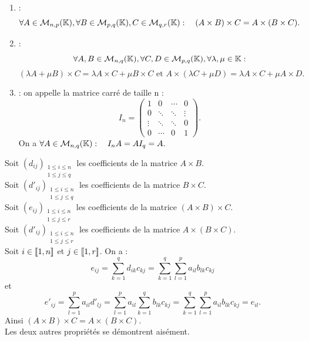 \documentclass{book}
\begin{document}
\begin{Proposition}[Propriétés]
\begin{enumerate}
\item
   : $$\forall A \in   \mathcal{M}_{n,p}(\mathbb{K}),\forall  B \in   \mathcal{M}_{p,q}(\mathbb{K}),C \in   \mathcal{M}_{q,r}(\mathbb{K}):\quad  (A \times B) \times C = A \times (B \times C).$$
\item
   : 
  $$\forall A,B \in   \mathcal{M}_{n,q}(\mathbb{K}),\forall C,D \in   \mathcal{M}_{p,q}(\mathbb{K}),\forall \lambda,\mu \in \mathbb{K}:$$
  $$  (\lambda A + \mu B) \times C = \lambda A\times C + \mu B\times C\text{ et }A\times (\lambda C+ \mu D) =\lambda A\times C + \mu A\times D.$$
\item
   : on appelle  la matrice carré de taille n : $$I_n=\begin{pmatrix}1&0&\cdots &0\\0&\ddots &\ddots &\vdots \\\vdots &\ddots &\ddots &0\\0&\cdots &0&1\end{pmatrix}.$$
 On a $\forall A \in   \mathcal{M}_{n,q}(\mathbb{K}) :\quad I_n A =A I_q = A.$ 
\end{enumerate}
\end{Proposition}
\begin{Demonstration}
Soit $(d_{ij})_{\substack{1\leq i\leq n\\1\leq j\leq q}}$ les coefficients de la matrice $A\times B$.\\
Soit $(d'_{ij})_{\substack{1\leq i\leq n\\1\leq j\leq q}}$ les coefficients de la matrice $B\times C$.\\
Soit $(e_{ij})_{\substack{1\leq i\leq n\\1\leq j\leq r}}$ les coefficients de la matrice $(A\times B)\times C$.\\
Soit $(d'_{ij})_{\substack{1\leq i\leq n\\1\leq j\leq r}}$ les coefficients de la matrice $A\times (B\times C)$.\\
Soit $i\in \mathopen\lbrack\!\lbrack1,n \mathclose\rbrack\!\rbrack$ et $j\in \mathopen\lbrack\!\lbrack1,r \mathclose\rbrack\!\rbrack$. 
On a :
$$e_{ij}=\sum_{k=1}^q d_{ik}c_{kj}=\sum_{k=1}^q \sum_{l=1}^p a_{il}b_{lk} c_{kj}$$
et  
$$e'_{ij}=\sum_{l=1}^p a_{il}d'_{lj}=\sum_{l=1}^p  a_{il}\sum_{k=1}^q b_{lk} c_{kj}=\sum_{k=1}^q \sum_{l=1}^p a_{il}b_{lk} c_{kj}=e_{il}.$$
Ainsi $(A \times B) \times C = A \times (B \times C).$\\
Les deux autres propriétés se démontrent aisément. 
\end{Demonstration}
\end{document}
